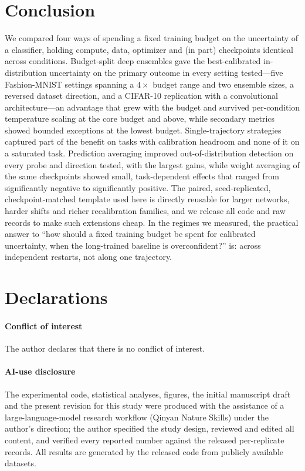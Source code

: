 \documentclass[11pt,a4paper]{article}
\begin{document}
\section{Conclusion}\label{sec:conclusion}

We compared four ways of spending a fixed training budget on the
uncertainty of a classifier, holding compute, data, optimizer and (in part)
checkpoints identical across conditions. Budget-split deep ensembles gave
the best-calibrated in-distribution uncertainty on the primary outcome in
every setting tested---five Fashion-MNIST settings spanning a $4\times$
budget range and two ensemble sizes, a reversed dataset direction, and a
CIFAR-10 replication with a convolutional architecture---an advantage that
grew with the budget and survived per-condition temperature scaling at the
core budget and above, while secondary metrics showed bounded exceptions at
the lowest budget. Single-trajectory strategies captured part of the
benefit on tasks with calibration headroom and none of it on a saturated
task. Prediction averaging improved out-of-distribution detection on
every probe and direction tested, with the largest gains, while weight
averaging of the same checkpoints showed small, task-dependent effects
that ranged from significantly negative to significantly positive. The
paired, seed-replicated, checkpoint-matched template used
here is directly reusable for larger networks, harder shifts and richer
recalibration families, and we release all code and raw records to make
such extensions cheap. In the regimes we measured, the practical answer to
``how should a fixed training budget be spent for calibrated uncertainty,
when the long-trained baseline is overconfident?'' is: across independent
restarts, not along one trajectory.

\section*{Declarations}

\paragraph{Conflict of interest}
The author declares that there is no conflict of interest.

\paragraph{AI-use disclosure}
The experimental code, statistical analyses, figures, the initial manuscript
draft and the present revision for this study were produced with the
assistance of a large-language-model
research workflow (Qinyan Nature Skills) under the author's direction; the
author specified the study design, reviewed and edited all content, and
verified every reported number against the released per-replicate records.
All results are generated by the released code from publicly available
datasets.
\end{document}
